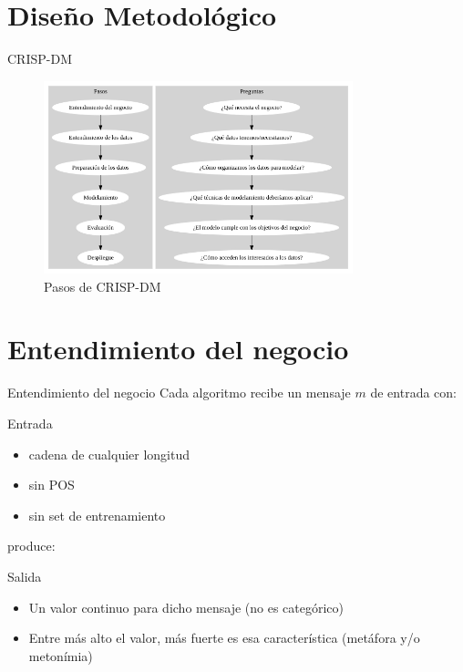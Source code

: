 \documentclass[presentation]{beamer}
\begin{document}
\section{Diseño Metodológico}
\label{sec:orgcbf3a20}

\begin{frame}[label={sec:org00d07a2}]{CRISP-DM}
\begin{figure}
\caption{Pasos de CRISP-DM}
 \includegraphics[width=0.8\textwidth]{./assets/metodologia.png}

 \end{figure}
\end{frame}

\section{Entendimiento del negocio}
\label{sec:org6469e9d}
\begin{frame}[label={sec:org698a3cd}]{Entendimiento del negocio}
Cada algoritmo recibe un mensaje  \(m\) de entrada con:
\begin{block}{Entrada}
\begin{itemize}
\item cadena de cualquier longitud
\item sin POS
\item sin set de entrenamiento
\end{itemize}
\end{block}
produce:

\begin{block}{Salida}
\begin{itemize}
\item  Un valor continuo para dicho mensaje (no es categórico)
\item  Entre más alto el valor, más fuerte es esa característica (metáfora y/o metonímia)
\end{itemize}
\end{block}
\end{frame}
\end{document}
